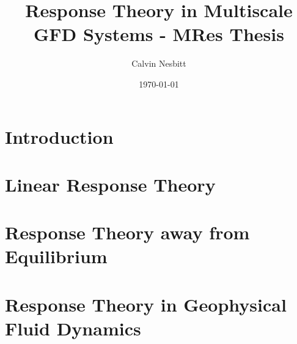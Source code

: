 \documentclass[11pt,letterpaper,oneside,openright]{report}
\title{Response Theory in Multiscale GFD Systems - MRes Thesis}
\date{\today}
\author{Calvin Nesbitt}
\begin{document}
\maketitle

\tableofcontents 

\cleardoublepage

\chapter{Introduction}

\chapter{Linear Response Theory} \label{Chapter:LRT}





\chapter{Response Theory away from Equilibrium}




\chapter{Response Theory in Geophysical Fluid Dynamics}




\clearpage 

\end{document}
